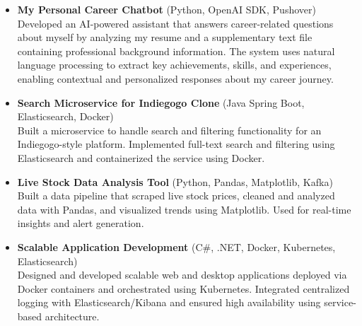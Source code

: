 \documentclass[a4paper,12pt]{article}
\begin{document}
\begin{itemize}[leftmargin=1.5em, itemsep=8pt]

    \item \textbf{My Personal Career Chatbot} (Python, OpenAI SDK, Pushover) \\
    Developed an AI-powered assistant that answers career-related questions about myself by analyzing my resume and a supplementary text file containing professional background information. The system uses natural language processing to extract key achievements, skills, and experiences, enabling contextual and personalized responses about my career journey.
    
    \item \textbf{Search Microservice for Indiegogo Clone} (Java Spring Boot, Elasticsearch, Docker) \\
    Built a microservice to handle search and filtering functionality for an Indiegogo-style platform. Implemented full-text search and filtering using Elasticsearch and containerized the service using Docker.

    \item \textbf{Live Stock Data Analysis Tool} (Python, Pandas, Matplotlib, Kafka) \\
    Built a data pipeline that scraped live stock prices, cleaned and analyzed data with Pandas, and visualized trends using Matplotlib. Used for real-time insights and alert generation.
    
    \item \textbf{Scalable Application Development} (C\#, .NET, Docker, Kubernetes, Elasticsearch) \\
    Designed and developed scalable web and desktop applications deployed via Docker containers and orchestrated using Kubernetes. Integrated centralized logging with Elasticsearch/Kibana and ensured high availability using service-based architecture.

\end{itemize}


\vfill
\end{document}
